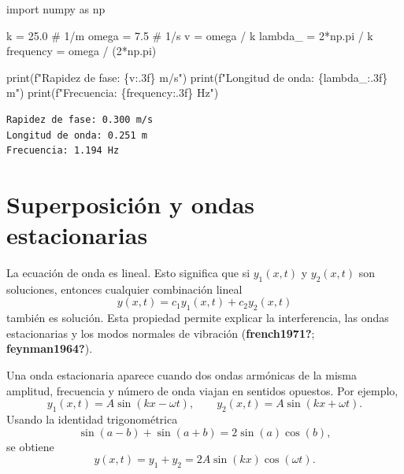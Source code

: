 \documentclass[
  letterpaper,
  DIV=11,
  numbers=noendperiod]{scrreprt}
\newenvironment{Shaded}{\begin{snugshade}}{\end{snugshade}}
\newcommand{\BuiltInTok}[1]{\textcolor[rgb]{0.00,0.23,0.31}{#1}}
\newcommand{\CommentTok}[1]{\textcolor[rgb]{0.37,0.37,0.37}{#1}}
\newcommand{\DecValTok}[1]{\textcolor[rgb]{0.68,0.00,0.00}{#1}}
\newcommand{\FloatTok}[1]{\textcolor[rgb]{0.68,0.00,0.00}{#1}}
\newcommand{\ImportTok}[1]{\textcolor[rgb]{0.00,0.46,0.62}{#1}}
\newcommand{\NormalTok}[1]{\textcolor[rgb]{0.00,0.23,0.31}{#1}}
\newcommand{\OperatorTok}[1]{\textcolor[rgb]{0.37,0.37,0.37}{#1}}
\newcommand{\SpecialCharTok}[1]{\textcolor[rgb]{0.37,0.37,0.37}{#1}}
\newcommand{\SpecialStringTok}[1]{\textcolor[rgb]{0.13,0.47,0.30}{#1}}
\begin{document}
\begin{Shaded}
\begin{Highlighting}[]
\ImportTok{import}\NormalTok{ numpy }\ImportTok{as}\NormalTok{ np}

\NormalTok{k }\OperatorTok{=} \FloatTok{25.0}        \CommentTok{\# 1/m}
\NormalTok{omega }\OperatorTok{=} \FloatTok{7.5}     \CommentTok{\# 1/s}
\NormalTok{v }\OperatorTok{=}\NormalTok{ omega }\OperatorTok{/}\NormalTok{ k}
\NormalTok{lambda\_ }\OperatorTok{=} \DecValTok{2}\OperatorTok{*}\NormalTok{np.pi }\OperatorTok{/}\NormalTok{ k}
\NormalTok{frequency }\OperatorTok{=}\NormalTok{ omega }\OperatorTok{/}\NormalTok{ (}\DecValTok{2}\OperatorTok{*}\NormalTok{np.pi)}

\BuiltInTok{print}\NormalTok{(}\SpecialStringTok{f"Rapidez de fase: }\SpecialCharTok{\{}\NormalTok{v}\SpecialCharTok{:.3f\}}\SpecialStringTok{ m/s"}\NormalTok{)}
\BuiltInTok{print}\NormalTok{(}\SpecialStringTok{f"Longitud de onda: }\SpecialCharTok{\{}\NormalTok{lambda\_}\SpecialCharTok{:.3f\}}\SpecialStringTok{ m"}\NormalTok{)}
\BuiltInTok{print}\NormalTok{(}\SpecialStringTok{f"Frecuencia: }\SpecialCharTok{\{}\NormalTok{frequency}\SpecialCharTok{:.3f\}}\SpecialStringTok{ Hz"}\NormalTok{)}
\end{Highlighting}
\end{Shaded}

\begin{verbatim}
Rapidez de fase: 0.300 m/s
Longitud de onda: 0.251 m
Frecuencia: 1.194 Hz
\end{verbatim}

\section{Superposición y ondas
estacionarias}\label{superposiciuxf3n-y-ondas-estacionarias}

La ecuación de onda es lineal. Esto significa que si \(y_1(x,t)\) y
\(y_2(x,t)\) son soluciones, entonces cualquier combinación lineal \[
y(x,t)=c_1y_1(x,t)+c_2y_2(x,t)
\] también es solución. Esta propiedad permite explicar la
interferencia, las ondas estacionarias y los modos normales de vibración
(\textbf{french1971?}; \textbf{feynman1964?}).

Una onda estacionaria aparece cuando dos ondas armónicas de la misma
amplitud, frecuencia y número de onda viajan en sentidos opuestos. Por
ejemplo, \[
y_1(x,t)=A\sin(kx-\omega t), \qquad
y_2(x,t)=A\sin(kx+\omega t).
\] Usando la identidad trigonométrica \[
\sin(a-b)+\sin(a+b)=2\sin(a)\cos(b),
\] se obtiene \[
y(x,t)=y_1+y_2=2A\sin(kx)\cos(\omega t).
\]
\end{document}

